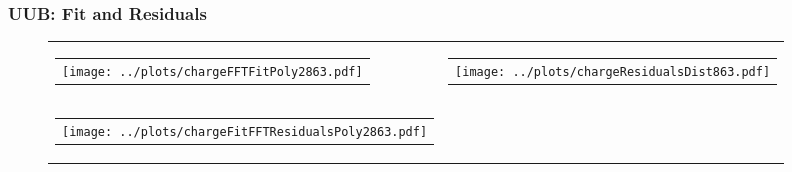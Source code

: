 \documentclass[aspectratio=169]{beamer}
\begin{document}
\begin{frame}
  \frametitle{UUB: Fit and Residuals}
  \begin{figure}
    \centering
    \begin{tabularx}{\textwidth}{CC}
      \begin{tabular}{l}
        \texttt{[image: ../plots/chargeFFTFitPoly2863.pdf]}
      \end{tabular}
      &
      \begin{tabular}{l}
        \texttt{[image: ../plots/chargeResidualsDist863.pdf]}
      \end{tabular}
      \\
      \begin{tabular}{l}
        \texttt{[image: ../plots/chargeFitFFTResidualsPoly2863.pdf]}
      \end{tabular}
      &
    \end{tabularx}
  \end{figure}
\end{frame}
\end{document}

